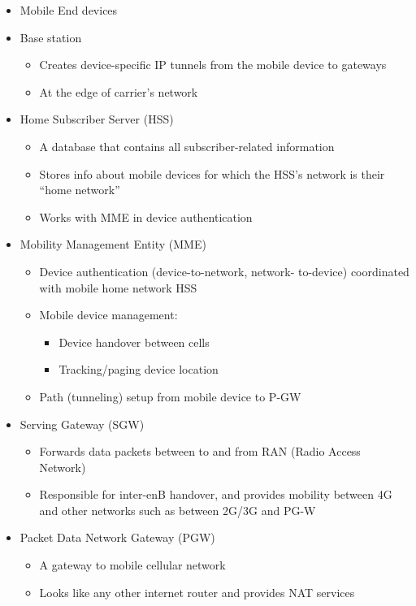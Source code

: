 \begin{itemize}
   \item Mobile End devices
   \item Base station
   \begin{itemize}
      \item Creates device-specific IP tunnels from
      the mobile device to gateways
      \item At the edge of carrier's network
   \end{itemize}
   \item Home Subscriber Server (HSS)
   \begin{itemize}
      \item A database that contains all subscriber-related information
      \item Stores info about mobile devices for which the HSS's network is their ``home network''
      \item Works with MME in device authentication
   \end{itemize}
   \item Mobility Management Entity (MME)
   \begin{itemize}
      \item Device authentication (device-to-network, network- to-device) coordinated with mobile home network HSS
      \item Mobile device management:
      \begin{itemize}
         \item Device handover between cells
         \item Tracking/paging device location
         \end{itemize}
      \item Path (tunneling) setup from mobile device to P-GW
   \end{itemize}
   \item Serving Gateway (SGW)
   \begin{itemize}
      \item Forwards data packets between to and from RAN (Radio Access Network)
      \item Responsible for inter-enB handover, and provides mobility between 4G and other networks such as between 2G/3G and PG-W
   \end{itemize}
   \item Packet Data Network Gateway (PGW)
   \begin{itemize}
      \item A gateway to mobile cellular network
      \item Looks like any other internet router and provides NAT services
   \end{itemize}
\end{itemize}

